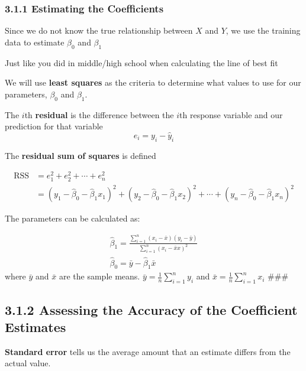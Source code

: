         \subsubsection*{3.1.1  Estimating the Coefficients}\label{estimating-the-coefficients}
        
        Since we do not know the true relationship between \(X\) and \(Y\), we
        use the training data to estimate \(\beta_0\) and \(\beta_1\)

        \begin{note}Just like you did in middle/high school when calculating the line of best fit
        \end{note}
        
        We will use \textbf{least squares} as the criteria to determine what
        values to use for our parameters, \(\beta_0\) and \(\beta_1\).
        
        The \(i\)th \textbf{residual} is the difference between the \(i\)th
        response variable and our prediction for that variable
        \begin{equation*}
        e_i = y_i - \hat y_i
        \end{equation*}
        
        The \textbf{residual sum of squares} is defined
        
        
        \begin{align*}
            \text{RSS} &= e_1^2 + e_2^2 + \cdots + e_n^2 \\
            &= (y_1 - \hat \beta_0 - \hat \beta_1 x_1)^2 + (y_2 - \hat \beta_0 - \hat \beta_1 x_2)^2  + \cdots + (y_n - \hat \beta_0 - \hat \beta_1 x_n)^2 
        \end{align*}
        
        
        The parameters can be calculated as:
        
        \begin{gather*}
        \hat \beta_1 = \frac{\sum_{i=1}^n(x_i - \bar x)(y_i-\bar y)}{\sum_{i=1}^n(x_i - \bar xx)^2}\\
        \hat \beta_0 = \bar y - \hat \beta_1 \bar x
    \end{gather*}
     where \(\bar y\) and \(\bar x\) are the sample means.
        \(\bar y = \frac{1}{n}\sum_{i=1}^n y_i\) and
        \(\bar x = \frac{1}{n}\sum_{i=1}^n x_i\) \#\#\# 
        \subsection*{3.1.2 Assessing the Accuracy of the Coefficient Estimates}
        \textbf{Standard error} tells us the average amount that an estimate differs from the actual value.
        
